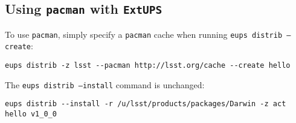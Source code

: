 \documentclass{article}
\newcommand{\code}[1]{\texttt{#1}}
\newcommand{\eups}{\code{ExtUPS}}
\newcommand{\pacman}{\code{pacman}}
\begin{document}
\subsection{Using \pacman{} with \eups{}}

To use \pacman{}, simply specify a \pacman{} cache when running \code{eups distrib --create}:
\begin{verbatim}
eups distrib -z lsst --pacman http://lsst.org/cache --create hello
\end{verbatim}

The \code{eups distrib --install} command is unchanged:
\begin{verbatim}
eups distrib --install -r /u/lsst/products/packages/Darwin -z act hello v1_0_0
\end{verbatim}
\end{document}
